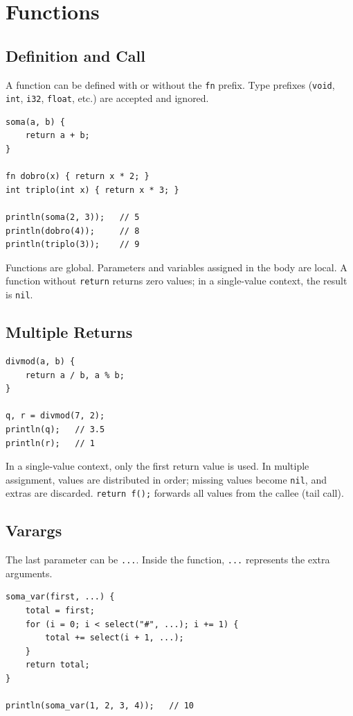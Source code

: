 \documentclass[11pt,a4paper,oneside]{report}
\newcommand{\code}[1]{\texttt{#1}}
\begin{document}
\chapter{Functions}
\label{cap:funcoes}

\section{Definition and Call}
A function can be defined with or without the \code{fn} prefix. Type
prefixes (\code{void}, \code{int}, \code{i32}, \code{float}, etc.) are
accepted and ignored.

\begin{lstlisting}
soma(a, b) {
    return a + b;
}

fn dobro(x) { return x * 2; }
int triplo(int x) { return x * 3; }

println(soma(2, 3));   // 5
println(dobro(4));     // 8
println(triplo(3));    // 9
\end{lstlisting}

Functions are global. Parameters and variables assigned in the body are
local. A function without \code{return} returns zero values; in a
single-value context, the result is \code{nil}.

\section{Multiple Returns}
\begin{lstlisting}
divmod(a, b) {
    return a / b, a % b;
}

q, r = divmod(7, 2);
println(q);   // 3.5
println(r);   // 1
\end{lstlisting}

In a single-value context, only the first return value is used. In
multiple assignment, values are distributed in order; missing values
become \code{nil}, and extras are discarded. \code{return f();} forwards
all values from the callee (tail call).

\section{Varargs}
The last parameter can be \code{...}. Inside the function, \code{...}
represents the extra arguments.

\begin{lstlisting}
soma_var(first, ...) {
    total = first;
    for (i = 0; i < select("#", ...); i += 1) {
        total += select(i + 1, ...);
    }
    return total;
}

println(soma_var(1, 2, 3, 4));   // 10
\end{lstlisting}
\end{document}
